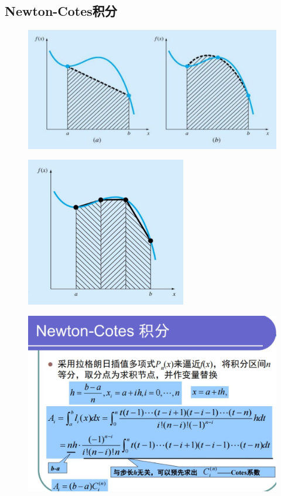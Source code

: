 \documentclass[a4paper,12pt]{ctexart}
\begin{document}
\subsection{Newton-Cotes积分}
\begin{figure}[H]
    \centering
    \includegraphics[width=14cm]{第五章作业/n-c1.jpg}
\end{figure}
\begin{figure}[H]
    \centering
    \includegraphics[width=7cm]{第五章作业/n-c2.jpg}
\end{figure}
\begin{figure}[H]
    \centering
    \includegraphics[width=12cm]{第五章作业/n-c3.jpg}
\end{figure}
\end{document}
